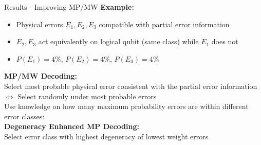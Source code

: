 \documentclass{dfki}
\begin{document}
\begin{frame}{Results - Improving MP/MW}
	\textbf{Example:}
	\begin{itemize}
		\item Physical errors $E_{1}, E_{2}, E_{3}$ compatible with partial error information\\
		\pause
		\item $E_{2}, E_{3}$ act equivalently on logical qubit (same class) while $E_{1}$ does not\\
		\pause
		\item $P(E_{1})=4\%$, $P(E_{2})=4\%$, $P(E_{3})=4\%$
	\end{itemize}
	\pause
	\textbf{MP/MW Decoding:}\\
	Select most probable physical error consistent with the partial error information\\
	$\Leftrightarrow$ Select randomly under most probable errors\\
	\pause
	Use knowledge on how many maximum probability errors are within different error classes:\\
	\textbf{Degeneracy Enhanced MP Decoding:}\\
	Select error class with highest degeneracy of lowest weight errors\\
\end{frame}
\end{document}
